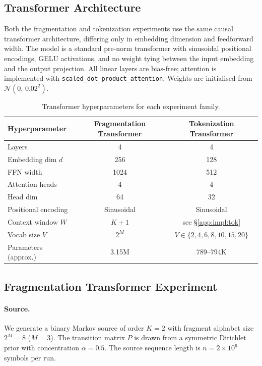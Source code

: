 \documentclass{article}
\theoremstyle{plain}
\theoremstyle{definition}
\theoremstyle{remark}
\begin{document}
\subsection{Transformer Architecture}
\label{app:impl:arch}

Both the fragmentation and tokenization experiments use the same causal
transformer architecture, differing only in embedding dimension and
feedforward width.
The model is a standard pre-norm transformer with
sinusoidal positional encodings, GELU
activations, and no weight tying between the
input embedding and the output projection.
All linear layers are bias-free; attention is implemented with
\texttt{scaled\_dot\_product\_attention}.
Weights are initialised from $\mathcal{N}(0,\,0.02^{2})$.

\begin{table}[h]
\centering
\caption{Transformer hyperparameters for each experiment family.}
\label{tab:arch}
\small
\begin{tabular}{lcc}
\toprule
\textbf{Hyperparameter} & \textbf{Fragmentation Transformer} & \textbf{Tokenization Transformer} \\
\midrule
Layers               & 4       & 4       \\
Embedding dim $d$    & 256     & 128     \\
FFN width            & 1024    & 512     \\
Attention heads      & 4       & 4       \\
Head dim             & 64      & 32      \\
Positional encoding  & Sinusoidal & Sinusoidal \\
Context window $W$   & $K{+}1$ & see \S\ref{app:impl:tok} \\
Vocab size $V$       & $2^M$   & $V \in \{2,4,6,8,10,15,20\}$ \\
Parameters (approx.) & 3.15M   & 789–794K \\
\bottomrule
\end{tabular}
\end{table}

\subsection{Fragmentation Transformer Experiment}
\label{app:impl:frag}

\paragraph{Source.}
We generate a binary Markov source of order $K=2$ with fragment alphabet
size $2^M = 8$ ($M=3$).
The transition matrix $P$ is drawn from a symmetric Dirichlet prior with
concentration $\alpha=0.5$.
The source sequence length is $n=2\times10^6$ symbols per run.
\end{document}
